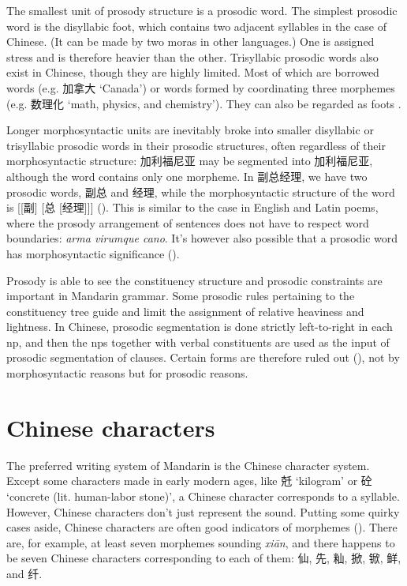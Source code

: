 \documentclass[UTF8, a4paper, oneside, scheme=plain, 12pt]{ctexrep}
\newcommand*{\citesec}[1]{\S~{#1}}
\newcommand{\form}[1]{\emph{#1}}
\newcommand{\translate}[1]{`#1'}
\begin{document}
The smallest unit of prosody structure 
is a prosodic word.
The simplest prosodic word is the disyllabic foot, 
which contains two adjacent syllables in the case of Chinese.
(It can be made by two moras in other languages.)
One is assigned stress and is therefore heavier than the other.
Trisyllabic prosodic words also exist in Chinese,
though they are highly limited.
Most of which are borrowed words (e.g. 加拿大 \translate{Canada})
or words formed by coordinating three morphemes (e.g. 数理化 \translate{math, physics, and chemistry}).
They can also be regarded as foots \citep[\citesec{2.2}]{feng2000}.

Longer morphosyntactic units are 
inevitably broke into smaller disyllabic or trisyllabic prosodic words
in their prosodic structures,
often regardless of their morphosyntactic structure:
加利福尼亚 may be segmented into 加利\textbar 福尼亚, 
although the word contains only one morpheme.
In 副总经理,
we have two prosodic words,
副总 and 经理,
while the morphosyntactic structure of the word is [[副] [总 [经理]]]
().
This is similar to the case in English and Latin poems,
where the prosody arrangement of sentences does not have to respect word boundaries:
\form{arma vi\textbar rumque ca\textbar no}.
It's however also possible that 
a prosodic word has morphosyntactic significance
().

Prosody is able to see the constituency structure
and prosodic constraints are important in Mandarin grammar.
Some prosodic rules pertaining to the constituency tree 
guide and limit the assignment of relative heaviness and lightness.
In Chinese, prosodic segmentation is done strictly left-to-right 
in each \ac{np},
and then the \ac{np}s together with verbal constituents 
are used as the input of prosodic segmentation of clauses.
Certain forms are therefore ruled out
(), 
not by morphosyntactic reasons but for prosodic reasons.

\section{Chinese characters}\label{sec:chinese-character}

The preferred writing system of Mandarin is the Chinese character system.
Except some characters made in early modern ages,
like 兛 \translate{kilogram} or 砼 \translate{concrete (lit. human-labor stone)},
a Chinese character corresponds to a syllable.
However, Chinese characters don't just represent the sound.
Putting some quirky cases aside,
Chinese characters are often good indicators of morphemes
().
There are, for example, at least seven morphemes sounding \form{xi\={a}n},
and there happens to be seven Chinese characters corresponding to each of them:
仙, 先, 籼, 掀, 锨, 鲜, and 纤.
\end{document}
